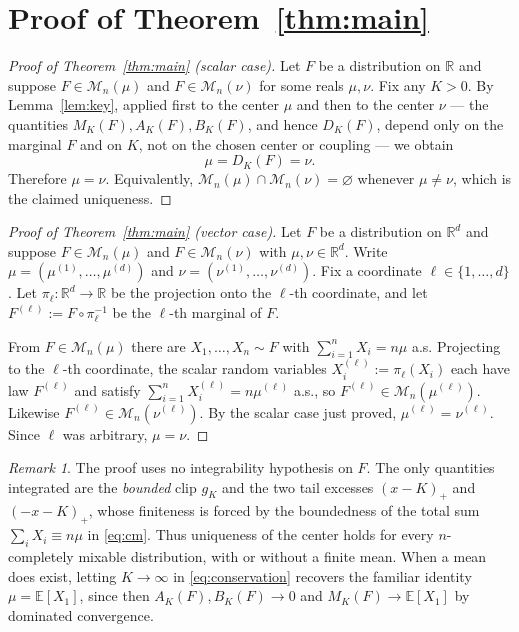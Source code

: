 \documentclass{amsart}
\theoremstyle{definition}
\theoremstyle{remark}
\newtheorem{remark}{Remark}
\begin{document}
\section{Proof of Theorem~\ref{thm:main}}

\begin{proof}[Proof of Theorem~\ref{thm:main} (scalar case)]
Let $F$ be a distribution on $\mathbb{R}$ and suppose $F\in\mathcal{M}_n(\mu)$ and
$F\in\mathcal{M}_n(\nu)$ for some reals $\mu,\nu$. Fix any $K>0$. By Lemma~\ref{lem:key},
applied first to the center $\mu$ and then to the center $\nu$ — the quantities
$M_K(F),A_K(F),B_K(F)$, and hence $D_K(F)$, depend only on the marginal $F$ and on $K$, not
on the chosen center or coupling — we obtain
\[
\mu=D_K(F)=\nu .
\]
Therefore $\mu=\nu$. Equivalently, $\mathcal{M}_n(\mu)\cap\mathcal{M}_n(\nu)=\varnothing$
whenever $\mu\ne\nu$, which is the claimed uniqueness.
\end{proof}

\begin{proof}[Proof of Theorem~\ref{thm:main} (vector case)]
Let $F$ be a distribution on $\mathbb{R}^d$ and suppose $F\in\mathcal{M}_n(\mu)$ and
$F\in\mathcal{M}_n(\nu)$ with $\mu,\nu\in\mathbb{R}^d$. Write $\mu=(\mu^{(1)},\dots,\mu^{(d)})$
and $\nu=(\nu^{(1)},\dots,\nu^{(d)})$. Fix a coordinate $\ell\in\{1,\dots,d\}$. Let
$\pi_\ell:\mathbb{R}^d\to\mathbb{R}$ be the projection onto the $\ell$-th coordinate, and let
$F^{(\ell)}:=F\circ\pi_\ell^{-1}$ be the $\ell$-th marginal of $F$.

From $F\in\mathcal{M}_n(\mu)$ there are $X_1,\dots,X_n\sim F$ with
$\sum_{i=1}^n X_i=n\mu$ a.s. Projecting to the $\ell$-th coordinate, the scalar random
variables $X_i^{(\ell)}:=\pi_\ell(X_i)$ each have law $F^{(\ell)}$ and satisfy
$\sum_{i=1}^n X_i^{(\ell)}=n\mu^{(\ell)}$ a.s., so $F^{(\ell)}\in\mathcal{M}_n(\mu^{(\ell)})$.
Likewise $F^{(\ell)}\in\mathcal{M}_n(\nu^{(\ell)})$. By the scalar case just proved,
$\mu^{(\ell)}=\nu^{(\ell)}$. Since $\ell$ was arbitrary, $\mu=\nu$.
\end{proof}

\begin{remark}
The proof uses no integrability hypothesis on $F$. The only quantities integrated are the
\emph{bounded} clip $g_K$ and the two tail excesses $(x-K)_+$ and $(-x-K)_+$, whose finiteness
is forced by the boundedness of the total sum $\sum_i X_i\equiv n\mu$ in
\eqref{eq:cm}. Thus uniqueness of the center holds for every $n$-completely mixable
distribution, with or without a finite mean. When a mean does exist, letting $K\to\infty$ in
\eqref{eq:conservation} recovers the familiar identity $\mu=\mathbb{E}[X_1]$, since then
$A_K(F),B_K(F)\to0$ and $M_K(F)\to\mathbb{E}[X_1]$ by dominated convergence.
\end{remark}
\end{document}
